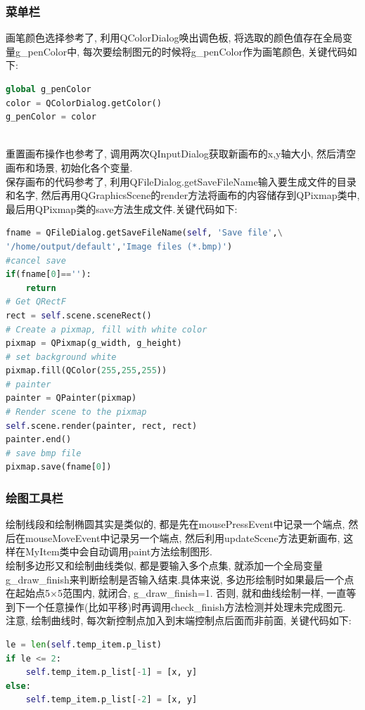 \documentclass[a4paper,UTF8]{article}
\theoremstyle{definition}
\begin{document}
\subsubsection{菜单栏}
画笔颜色选择参考了\cite{pyqt5_ch}, 利用QColorDialog唤出调色板, 将选取的颜色值存在全局变量g\_penColor中, 每次要绘制图元的时候将g\_penColor作为画笔颜色, 关键代码如下:\\
\begin{lstlisting}[language={python}]
global g_penColor
color = QColorDialog.getColor()
g_penColor = color
\end{lstlisting}
\indent\\
\indent 重置画布操作也参考了\cite{pyqt5_ch}, 调用两次QInputDialog获取新画布的x,y轴大小, 然后清空画布和场景, 初始化各个变量.\\
\indent 保存画布的代码参考了\cite{save_canvas}, 利用QFileDialog.getSaveFileName输入要生成文件的目录和名字, 然后再用QGraphicsScene的render方法将画布的内容储存到QPixmap类中, 最后用QPixmap类的save方法生成文件.关键代码如下:\\
\begin{lstlisting}[language={python}]
fname = QFileDialog.getSaveFileName(self, 'Save file',\
'/home/output/default','Image files (*.bmp)')        
#cancel save
if(fname[0]==''):
    return
# Get QRectF
rect = self.scene.sceneRect()
# Create a pixmap, fill with white color
pixmap = QPixmap(g_width, g_height)
# set background white
pixmap.fill(QColor(255,255,255))
# painter
painter = QPainter(pixmap)
# Render scene to the pixmap
self.scene.render(painter, rect, rect)
painter.end()
# save bmp file
pixmap.save(fname[0])    
\end{lstlisting}
\subsubsection{绘图工具栏}
绘制线段和绘制椭圆其实是类似的, 都是先在mousePressEvent中记录一个端点, 然后在mouseMoveEvent中记录另一个端点, 然后利用updateScene方法更新画布, 这样在MyItem类中会自动调用paint方法绘制图形.\\
\indent 绘制多边形又和绘制曲线类似, 都是要输入多个点集, 就添加一个全局变量g\_draw\_finish来判断绘制是否输入结束.具体来说, 多边形绘制时如果最后一个点在起始点5$\times$5范围内, 就闭合, g\_draw\_finish=1. 否则, 就和曲线绘制一样, 一直等到下一个任意操作(比如平移)时再调用check\_finish方法检测并处理未完成图元.\\
\indent 注意, 绘制曲线时, 每次新控制点加入到末端控制点后面而非前面, 关键代码如下:\\
\begin{lstlisting}[language={python}]
le = len(self.temp_item.p_list)
if le <= 2: 
    self.temp_item.p_list[-1] = [x, y]
else:
    self.temp_item.p_list[-2] = [x, y]
\end{lstlisting}
\end{document}
